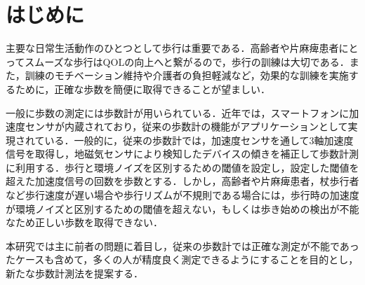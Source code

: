 \chapter{はじめに}
主要な日常生活動作のひとつとして歩行は重要である．高齢者や片麻痺患者にとってスムーズな歩行はQOLの向上へと繋がるので，歩行の訓練は大切である．また，訓練のモチベーション維持や介護者の負担軽減など，効果的な訓練を実施するために，正確な歩数を簡便に取得できることが望ましい．

一般に歩数の測定には歩数計が用いられている．近年では，スマートフォンに加速度センサが内蔵されており，従来の歩数計の機能がアプリケーションとして実現されている．一般的に，従来の歩数計では，加速度センサを通して3軸加速度信号を取得し，地磁気センサにより検知したデバイスの傾きを補正して歩数計測に利用する．歩行と環境ノイズを区別するための閾値を設定し，設定した閾値を超えた加速度信号の回数を歩数とする．しかし，高齢者や片麻痺患者，杖歩行者など歩行速度が遅い場合や歩行リズムが不規則である場合には，歩行時の加速度が環境ノイズと区別するための閾値を超えない，もしくは歩き始めの検出が不能なため正しい歩数を取得できない．

本研究では主に前者の問題に着目し，従来の歩数計では正確な測定が不能であったケースも含めて，多くの人が精度良く測定できるようにすることを目的とし，新たな歩数計測法を提案する．




